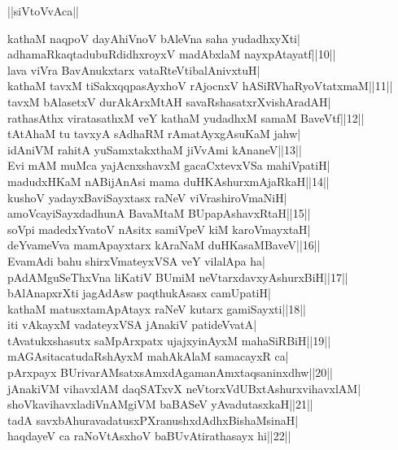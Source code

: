 \documentclass{article}
\begin{document}
\begin{center}
||siVtoVvAca||
\end{center}

kathaM naqpoV dayAhiVnoV bAleVna saha yudadhxyXti|\\
adhamaRkaqtadubuRdidhxroyxV madAbxlaM nayxpAtayatf||10||\\
lava viVra BavAnukxtarx vataRteVtibalAnivxtuH|\\
kathaM tavxM tiSakxqqpasAyxhoV rAjocnxV hASiRVhaRyoVtatxmaM||11||\\
tavxM  bAlasetxV durAkArxMtAH savaRshasatxrXvishAradAH|\\
rathasAthx viratasathxM veY kathaM yudadhxM samaM BaveVtf||12||\\
tAtAhaM tu tavxyA sAdhaRM rAmatAyxgAsuKaM ja{hw}|\\
idAniVM rahitA yuSamxtakxthaM jiVvAmi kAnaneV||13||\\
Evi mAM muMca yajAcnxshavxM gacaCxtevxVSa mahiVpatiH|\\
madudxHKaM nABijAnAsi mama duHKAshurxmAjaRkaH||14||\\
kushoV yadayxBaviSayxtasx raNeV viVrashiroVmaNiH|\\
amoVcayiSayxdadhunA BavaMtaM BUpapAshavxRtaH||15||\\
soVpi madedxYvatoV nAsitx samiVpeV kiM karoVmayxtaH|\\
deYvameVva mamApayxtarx kAraNaM duHKasaMBaveV||16||\\
EvamAdi bahu shirxVmateyxVSA veY vilalApa ha|\\
pAdAMguSeThxVna liKatiV BUmiM neVtarxdavxyAshurxBiH||17||\\
bAlAnapxrXti jagAdAsw paqthukAsasx camUpatiH|\\
kathaM matusxtamApAtayx raNeV kutarx gamiSayxti||18||\\
iti vAkayxM vadateyxVSA jAnakiV patideVvatA|\\
tAvatukxshasutx saMpArxpatx ujajxyinAyxM mahaSiRBiH||19||\\
mAGAsitacatudaRshAyxM mahAkAlaM samacayxR ca|\\
pArxpayx BUrivarAMsatxsAmxdAgamanAmxtaqsaninxdhw||20||\\
jAnakiVM vihavxlAM daqSATxvX neVtorxVdUBxtAshurxvihavxlAM|\\
shoVkavihavxladiVnAMgiVM baBASeV yAvadutasxkaH||21||\\
tadA savxbAhuravadatusxPXranushxdAdhxBishaMsinaH|\\
haqdayeV ca raNoVtAsxhoV baBUvAtirathasayx hi||22||\\
\end{document}
